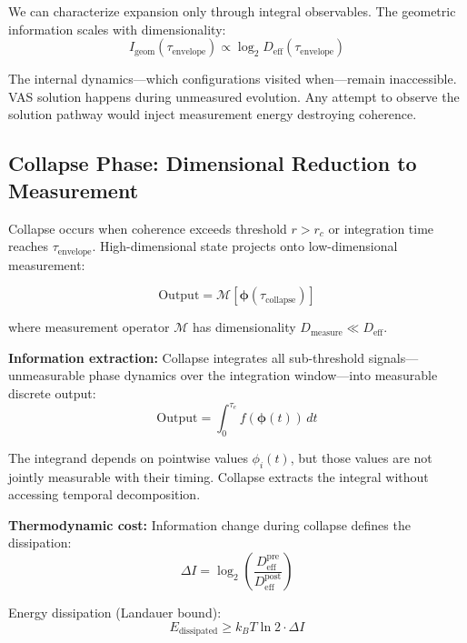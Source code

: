 \documentclass[12pt]{article}
\begin{document}
We can characterize expansion only through integral observables. The geometric information scales with dimensionality:
\begin{equation}
I_{\text{geom}}(\tau_{\text{envelope}}) \propto \log_2 D_{\text{eff}}(\tau_{\text{envelope}})
\end{equation}

The internal dynamics---which configurations visited when---remain inaccessible. VAS solution happens during unmeasured evolution. Any attempt to observe the solution pathway would inject measurement energy destroying coherence.

\subsection{Collapse Phase: Dimensional Reduction to Measurement}

Collapse occurs when coherence exceeds threshold $r > r_c$ or integration time reaches $\tau_{\text{envelope}}$. High-dimensional state projects onto low-dimensional measurement:

\begin{equation}
\text{Output} = \mathcal{M}[\boldsymbol{\phi}(\tau_{\text{collapse}})]
\end{equation}

where measurement operator $\mathcal{M}$ has dimensionality $D_{\text{measure}} \ll D_{\text{eff}}$.

\textbf{Information extraction:} Collapse integrates all sub-threshold signals---unmeasurable phase dynamics over the integration window---into measurable discrete output:
\begin{equation}
\text{Output} = \int_0^{\tau_e} f(\boldsymbol{\phi}(t)) \, dt
\end{equation}

The integrand depends on pointwise values $\phi_i(t)$, but those values are not jointly measurable with their timing. Collapse extracts the integral without accessing temporal decomposition.

\textbf{Thermodynamic cost:} Information change during collapse defines the dissipation:
\begin{equation}
\Delta I = \log_2\left(\frac{D_{\text{eff}}^{\text{pre}}}{D_{\text{eff}}^{\text{post}}}\right)
\end{equation}

Energy dissipation (Landauer bound):
\begin{equation}
E_{\text{dissipated}} \geq k_B T \ln 2 \cdot \Delta I
\end{equation}
\end{document}
